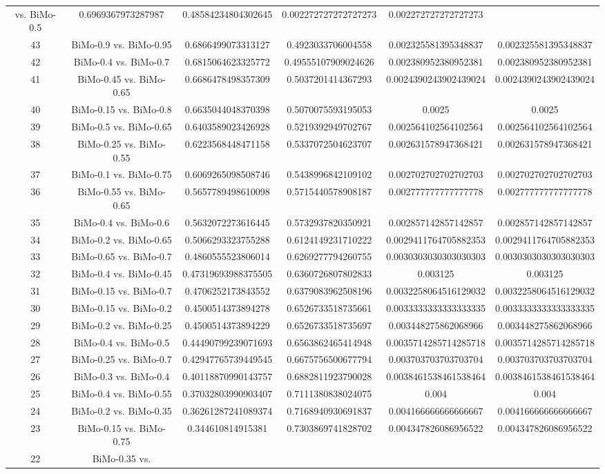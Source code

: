 \documentclass[a4paper,10pt]{article}
\begin{document}
\begin{landscape}
\begin{table}[!htp]
\begin{tabular}{cccccc}
vs. BiMo-0.5&0.6969367973287987&0.48584234804302645&0.002272727272727273&0.002272727272727273\\43&BiMo-0.9 vs. BiMo-0.95&0.6866499073313127&0.4923033706004558&0.002325581395348837&0.002325581395348837\\42&BiMo-0.4 vs. BiMo-0.7&0.6815064623325772&0.49555107909024626&0.002380952380952381&0.002380952380952381\\41&BiMo-0.45 vs. BiMo-0.65&0.6686478498357309&0.5037201414367293&0.0024390243902439024&0.0024390243902439024\\40&BiMo-0.15 vs. BiMo-0.8&0.6635044048370398&0.5070075593195053&0.0025&0.0025\\39&BiMo-0.5 vs. BiMo-0.65&0.6403589023426928&0.5219392949702767&0.002564102564102564&0.002564102564102564\\38&BiMo-0.25 vs. BiMo-0.55&0.6223568448471158&0.5337072504623707&0.002631578947368421&0.002631578947368421\\37&BiMo-0.1 vs. BiMo-0.75&0.6069265098508746&0.5438996842109102&0.002702702702702703&0.002702702702702703\\36&BiMo-0.55 vs. BiMo-0.65&0.5657789498610098&0.5715440578908187&0.002777777777777778&0.002777777777777778\\35&BiMo-0.4 vs. BiMo-0.6&0.5632072273616445&0.5732937820350921&0.002857142857142857&0.002857142857142857\\34&BiMo-0.2 vs. BiMo-0.65&0.5066293323755288&0.6124149231710222&0.0029411764705882353&0.0029411764705882353\\33&BiMo-0.65 vs. BiMo-0.7&0.4860555523806014&0.6269277794260755&0.0030303030303030303&0.0030303030303030303\\32&BiMo-0.4 vs. BiMo-0.45&0.47319693988375505&0.6360726807802833&0.003125&0.003125\\31&BiMo-0.15 vs. BiMo-0.7&0.4706252173843552&0.6379083962508196&0.0032258064516129032&0.0032258064516129032\\30&BiMo-0.15 vs. BiMo-0.2&0.4500514373894278&0.6526733518735661&0.0033333333333333335&0.0033333333333333335\\29&BiMo-0.2 vs. BiMo-0.25&0.4500514373894229&0.6526733518735697&0.003448275862068966&0.003448275862068966\\28&BiMo-0.4 vs. BiMo-0.5&0.44490799239071693&0.6563862465414948&0.0035714285714285718&0.0035714285714285718\\27&BiMo-0.25 vs. BiMo-0.7&0.42947765739449545&0.6675756500677794&0.003703703703703704&0.003703703703703704\\26&BiMo-0.3 vs. BiMo-0.4&0.40118870990143757&0.6882811923790028&0.0038461538461538464&0.0038461538461538464\\25&BiMo-0.4 vs. BiMo-0.55&0.37032803990903407&0.7111380838024075&0.004&0.004\\24&BiMo-0.2 vs. BiMo-0.35&0.36261287241089374&0.7168940930691837&0.004166666666666667&0.004166666666666667\\23&BiMo-0.15 vs. BiMo-0.75&0.344610814915381&0.7303869741828702&0.004347826086956522&0.004347826086956522\\22&BiMo-0.35 vs. 
\end{tabular}
\end{table}
\end{landscape}
\end{document}
